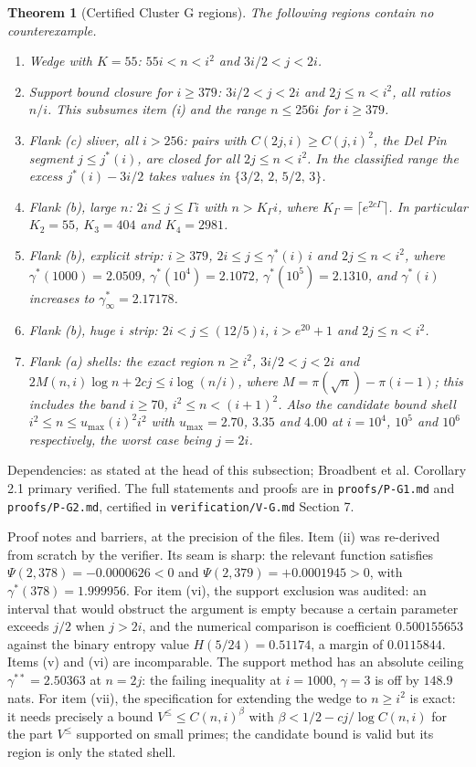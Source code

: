 \documentclass[11pt]{article}
\newtheorem{theorem}{Theorem}[section]
\theoremstyle{remark}
\begin{document}
\begin{theorem}[Certified Cluster G regions]
\label{thm:G}
The following regions contain no counterexample.
\begin{enumerate}[label=(\roman*),leftmargin=2.5em]
\item Wedge with $K=55$: $55i<n<i^2$ and $3i/2<j<2i$.
\item Support bound closure for $i\ge 379$: $3i/2<j<2i$ and $2j\le n<i^2$, all ratios $n/i$. This subsumes item (i) and the range $n\le 256i$ for $i\ge 379$.
\item Flank (c) sliver, all $i>256$: pairs with $C(2j,i)\ge C(j,i)^2$, the Del Pin segment $j\le j^*(i)$, are closed for all $2j\le n<i^2$. In the classified range the excess $j^*(i)-3i/2$ takes values in $\{3/2,\,2,\,5/2,\,3\}$.
\item Flank (b), large $n$: $2i\le j\le \Gamma i$ with $n>K_\Gamma i$, where $K_\Gamma=\lceil e^{2c\Gamma}\rceil$. In particular $K_2=55$, $K_3=404$ and $K_4=2981$.
\item Flank (b), explicit strip: $i\ge 379$, $2i\le j\le \gamma^*(i)\,i$ and $2j\le n<i^2$, where $\gamma^*(1000)=2.0509$, $\gamma^*(10^4)=2.1072$, $\gamma^*(10^5)=2.1310$, and $\gamma^*(i)$ increases to $\gamma^*_\infty=2.17178$.
\item Flank (b), huge $i$ strip: $2i<j\le (12/5)i$, $i>e^{20}+1$ and $2j\le n<i^2$.
\item Flank (a) shells: the exact region $n\ge i^2$, $3i/2<j<2i$ and $2M(n,i)\log n+2cj\le i\log(n/i)$, where $M=\pi(\sqrt n)-\pi(i-1)$; this includes the band $i\ge 70$, $i^2\le n<(i+1)^2$. Also the candidate bound shell $i^2\le n\le u_{\max}(i)^2 i^2$ with $u_{\max}=2.70$, $3.35$ and $4.00$ at $i=10^4$, $10^5$ and $10^6$ respectively, the worst case being $j=2i$.
\end{enumerate}
\end{theorem}

Dependencies: as stated at the head of this subsection; Broadbent et al. Corollary 2.1 primary verified. The full statements and proofs are in \texttt{proofs/P-G1.md} and \texttt{proofs/P-G2.md}, certified in \texttt{verification/V-G.md} Section 7.

Proof notes and barriers, at the precision of the files. Item (ii) was re-derived from scratch by the verifier. Its seam is sharp: the relevant function satisfies $\Psi(2,378)=-0.0000626<0$ and $\Psi(2,379)=+0.0001945>0$, with $\gamma^*(378)=1.999956$. For item (vi), the support exclusion was audited: an interval that would obstruct the argument is empty because a certain parameter exceeds $j/2$ when $j>2i$, and the numerical comparison is coefficient $0.500155653$ against the binary entropy value $H(5/24)=0.51174$, a margin of $0.0115844$. Items (v) and (vi) are incomparable. The support method has an absolute ceiling $\gamma^{**}=2.50363$ at $n=2j$: the failing inequality at $i=1000$, $\gamma=3$ is off by $148.9$ nats. For item (vii), the specification for extending the wedge to $n\ge i^2$ is exact: it needs precisely a bound $V^{\le}\le C(n,i)^\beta$ with $\beta<1/2-cj/\log C(n,i)$ for the part $V^{\le}$ supported on small primes; the candidate bound is valid but its region is only the stated shell.
\end{document}
